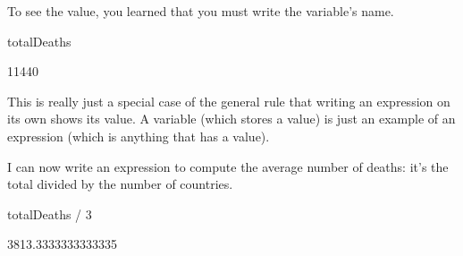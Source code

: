 \documentclass[letterpaper,10pt,english]{sphinxmanual}
\begin{document}
To see the value, you learned that you must write the variable’s name.


{
\begin{sphinxVerbatim}[commandchars=\\\{\}]
\llap{\color{nbsphinxin}[ ]:\,\hspace{\fboxrule}\hspace{\fboxsep}}
totalDeaths
\end{sphinxVerbatim}
}


{
\begin{sphinxVerbatim}[commandchars=\\\{\}]
\llap{\color{nbsphinxin}[ ]:\,\hspace{\fboxrule}\hspace{\fboxsep}}
11440
\end{sphinxVerbatim}
}

This is really just a special case of the general rule that writing an expression on its own shows its value. A variable (which stores a value) is just an example of an expression (which is anything that has a value).

I can now write an expression to compute the average number of deaths: it’s the total divided by the number of countries.


{
\begin{sphinxVerbatim}[commandchars=\\\{\}]
\llap{\color{nbsphinxin}[ ]:\,\hspace{\fboxrule}\hspace{\fboxsep}}
totalDeaths / 3
\end{sphinxVerbatim}
}


{
\begin{sphinxVerbatim}[commandchars=\\\{\}]
\llap{\color{nbsphinxin}[ ]:\,\hspace{\fboxrule}\hspace{\fboxsep}}
3813.3333333333335
\end{sphinxVerbatim}
}
\end{document}
